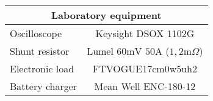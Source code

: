 \footnotesize
\begin{tabular}{|l|c|}
	\hline
	\multicolumn{2}{|c|}{\textbf{Laboratory equipment}} \\
	\hline
	Oscilloscope & Keysight DSOX 1102G \\
	Shunt resistor & Lumel $60\mathrm{mV}$ $50\mathrm{A}$ ($1,2\mathrm{m}\Omega$) \\
	Electronic load & FTVOGUE17cm0w5uh2 \\
	Battery charger & Mean Well ENC-180-12 \\
	\hline
\end{tabular}